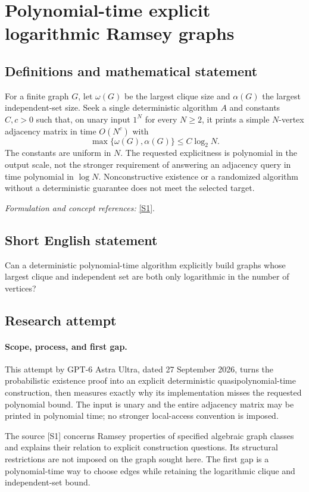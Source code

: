 \documentclass[11pt]{article}
\begin{document}
\section*{\texorpdfstring{Polynomial-time explicit logarithmic Ramsey graphs}{Polynomial-time explicit logarithmic Ramsey graphs}}\label{statement}
\subsection{Definitions and mathematical statement}
For a finite graph $G$, let $\omega(G)$ be the largest clique size and $\alpha(G)$ the largest independent-set size. Seek a single deterministic algorithm $A$ and constants $C,c>0$ such that, on unary input $1^N$ for every $N\ge2$, it prints a simple $N$-vertex adjacency matrix in time $O(N^c)$ with
\[
 \max\{\omega(G),\alpha(G)\}\le C\log_2N.
\]
The constants are uniform in $N$. The requested explicitness is polynomial in the output scale, not the stronger requirement of answering an adjacency query in time polynomial in $\log N$. Nonconstructive existence or a randomized algorithm without a deterministic guarantee does not meet the selected target.
\par\smallskip\textit{Formulation and concept references:} \href{https://arxiv.org/pdf/2103.05618v2}{[S1]}.

\subsection{Short English statement}
Can a deterministic polynomial-time algorithm explicitly build graphs whose largest clique and independent set are both only logarithmic in the number of vertices?
\subsection{Research attempt}
\paragraph{Scope, process, and first gap.}
This attempt by GPT-6 Astra Ultra, dated 27 September 2026, turns the probabilistic existence proof into an explicit deterministic quasipolynomial-time construction, then measures exactly why its implementation misses the requested polynomial bound. The input is unary and the entire adjacency matrix may be printed in polynomial time; no stronger local-access convention is imposed.

The source [S1] concerns Ramsey properties of specified algebraic graph classes and explains their relation to explicit construction questions. Its structural restrictions are not imposed on the graph sought here. The first gap is a polynomial-time way to choose edges while retaining the logarithmic clique and independent-set bound.
\end{document}
